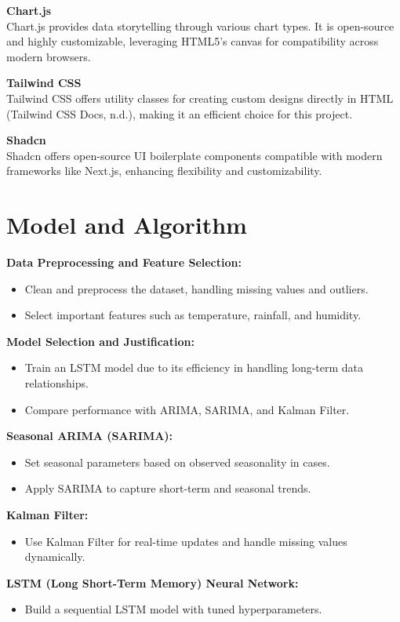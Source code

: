 \textbf{Chart.js} \\
Chart.js provides data storytelling through various chart types. It is open-source and highly customizable, leveraging HTML5's canvas for compatibility across modern browsers.

\textbf{Tailwind CSS} \\
Tailwind CSS offers utility classes for creating custom designs directly in HTML (Tailwind CSS Docs, n.d.), making it an efficient choice for this project.

\textbf{Shadcn} \\
Shadcn offers open-source UI boilerplate components compatible with modern frameworks like Next.js, enhancing flexibility and customizability.

\section{Model and Algorithm}
\textbf{Data Preprocessing and Feature Selection:}
\begin{itemize}
	\item Clean and preprocess the dataset, handling missing values and outliers.
	\item Select important features such as temperature, rainfall, and humidity.
\end{itemize}

\textbf{Model Selection and Justification:}
\begin{itemize}
	\item Train an LSTM model due to its efficiency in handling long-term data relationships.
	\item Compare performance with ARIMA, SARIMA, and Kalman Filter.
\end{itemize}

\textbf{Seasonal ARIMA (SARIMA):}
\begin{itemize}
	\item Set seasonal parameters based on observed seasonality in cases.
	\item Apply SARIMA to capture short-term and seasonal trends.
\end{itemize}

\textbf{Kalman Filter:}
\begin{itemize}
	\item Use Kalman Filter for real-time updates and handle missing values dynamically.
\end{itemize}

\textbf{LSTM (Long Short-Term Memory) Neural Network:}
\begin{itemize}
	\item Build a sequential LSTM model with tuned hyperparameters.
\end{itemize}


